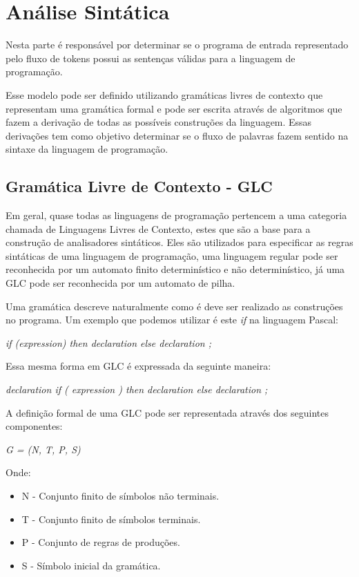 \section{Análise Sintática}

Nesta parte é responsável por determinar se o programa de entrada representado pelo fluxo de tokens possui as sentenças válidas para a linguagem de programação.

Esse modelo pode ser definido utilizando gramáticas livres de contexto que representam uma gramática formal e pode ser escrita através de algoritmos que fazem a derivação de todas as possíveis construções da linguagem.
Essas derivações tem como objetivo determinar se o fluxo de palavras fazem sentido na sintaxe da linguagem de programação.

\subsection{Gramática Livre de Contexto - GLC}

Em geral, quase todas as linguagens de programação pertencem a uma categoria chamada de Linguagens Livres de Contexto,
estes que são a base para a construção de analisadores sintáticos.
Eles são utilizados para especificar as regras sintáticas de uma linguagem de programação,
uma linguagem regular pode ser reconhecida por um automato finito determinístico e não determinístico,
já uma GLC pode ser reconhecida por um automato de pilha.

Uma gramática descreve naturalmente como é deve ser realizado as construções no programa.
Um exemplo que podemos utilizar é este \emph{if} na linguagem Pascal:

\emph{if (expression) then declaration else declaration ;}

Essa mesma forma em GLC é expressada da seguinte maneira:

\emph{declaration \textrightarrow  if ( expression ) then declaration else declaration ;}

A definição formal de uma GLC pode ser representada através dos seguintes componentes:

\emph{G = (N, T, P, S)}

Onde:

\begin{itemize}
  \item N - Conjunto finito de símbolos não terminais.
  \item T - Conjunto finito de símbolos terminais.
  \item P - Conjunto de regras de produções.
  \item S - Símbolo inicial da gramática.
\end{itemize}

